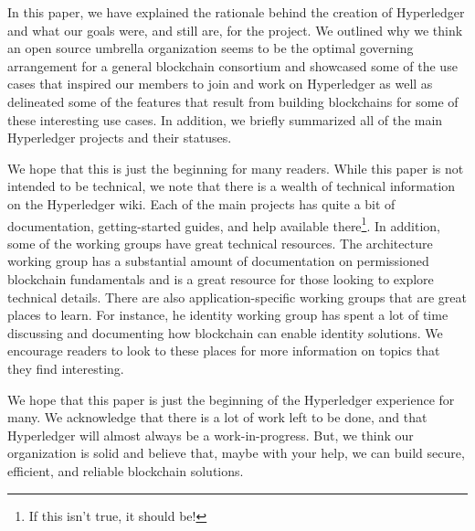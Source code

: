 In this paper, we have explained the rationale behind the creation of Hyperledger and what our goals were, and still are, for the project. We outlined why we think an open source umbrella organization seems to be the optimal governing arrangement for a general blockchain consortium and showcased some of the use cases that inspired our members to join and work on Hyperledger as well as delineated some of the features that result from building blockchains for some of these interesting use cases. In addition, we briefly summarized all of the main Hyperledger projects and their statuses.

We hope that this is just the beginning for many readers. While this paper is not intended to be technical, we note that there is a wealth of technical information on the Hyperledger wiki. Each of the main projects has quite a bit of documentation, getting-started guides, and help available there\footnote{If this isn't true, it should be!}. In addition, some of the working groups have great technical resources. The architecture working group has a substantial amount of documentation on permissioned blockchain fundamentals and is a great resource for those looking to explore technical details. There are also application-specific working groups that are great places to learn. For instance, he identity working group has spent a lot of time discussing and documenting how blockchain can enable identity solutions. We encourage readers to look to these places for more information on topics that they find interesting.

We hope that this paper is just the beginning of the Hyperledger experience for many. We acknowledge that there is a lot of work left to be done, and that Hyperledger will almost always be a work-in-progress. But, we think our organization is solid and believe that, maybe with your help, we can build secure, efficient, and reliable blockchain solutions.
